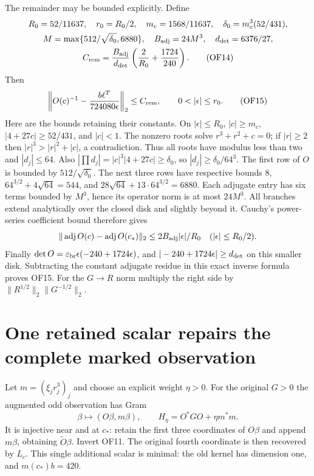 The remainder may be bounded explicitly. Define
\begin{gather}
 R_0=52/11637,\quad r_0=R_0/2,\quad m_c=1568/11637,
 \quad\delta_0=m_c^3(52/431),\notag\\
 M=\max\{512/\sqrt{\delta_0},6880\},\quad B_{
 \rm adj}=24M^3,\quad d_{\rm det}=6376/27,\notag\\
 C_{\rm rem}=\frac{B_{\rm adj}}{d_{\rm det}}
                   \left(\frac2{R_0}+\frac{1724}{240}\right).
 \tag{OF14}
\end{gather}
Then
\begin{equation}
 \left\|O(c)^{-1}-\frac{b\ell^T}{724080\epsilon}\right\|_2
 \le C_{\rm rem},\qquad 0<|\epsilon|\le r_0.\tag{OF15}
\end{equation}
Here are the bounds retaining their constants. On $|\epsilon|\le R_0$,
$|c|\ge m_c$, $|4+27c|\ge52/431$, and $|c|<1$.
The nonzero roots solve $r^3+r^2+c=0$; if $|r|\ge2$ then
$|r|^3>|r|^2+|c|$, a contradiction. Thus all roots have modulus
less than two and $|d_j|\le64$. Also
$|\prod d_j|=|c|^3|4+27c|\ge\delta_0$, so
$|d_j|\ge\delta_0/64^3$. The first row of $O$ is bounded by
$512/\sqrt{\delta_0}$. The next three rows have respective bounds
$8$, $64^{3/2}+4\sqrt{64}=544$, and
$28\sqrt{64}+13\cdot64^{3/2}=6880$. Each adjugate entry has six
terms bounded by $M^3$, hence its operator norm is at most $24M^3$.
All branches extend analytically over the closed disk and slightly
beyond it. Cauchy's power-series coefficient bound therefore gives
\[
 \|\operatorname{adj}O(c)-\operatorname{adj}O(c_*)\|_2
 \le 2B_{\rm adj}|\epsilon|/R_0\quad(|\epsilon|\le R_0/2).
\]
Finally $\det O=\varepsilon_{\rm br}\epsilon(-240+1724\epsilon)$,
and $|-240+1724\epsilon|\ge d_{\rm det}$ on this smaller disk.
Subtracting the constant adjugate residue in this exact inverse
formula proves OF15. For the $G\to R$ norm multiply the right side
by $\|R^{1/2}\|_2\|G^{-1/2}\|_2$.

\section{One retained scalar repairs the complete marked observation}
Let $m=(\xi_jr_j^3)_j$ and choose an explicit weight $\eta>0$.
For the original $G>0$ the augmented odd observation has Gram
\begin{equation}
 \beta\longmapsto (O\beta,m\beta),\qquad
 H_\eta=O^*GO+\eta m^*m.\tag{OF16}
\end{equation}
It is injective near and at $c_*$: retain the first three coordinates
of $O\beta$ and append $m\beta$, obtaining $\widetilde O\beta$.
Invert OF11. The original fourth coordinate is then recovered by
$L_c$. This single additional scalar is minimal: the old kernel
has dimension one, and $m(c_*)b=420$.

